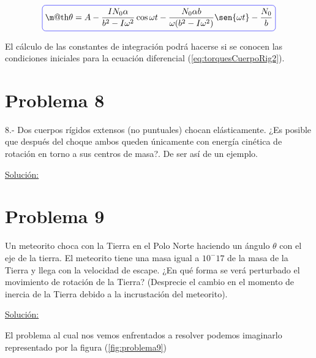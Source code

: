 \documentclass[a4paper,10pt]{article}
\makeatletter
\numberwithin{equation}{section}
\newcommand*{\boxcolor}{blue}
\renewcommand{\boxed}[1]{\textcolor{\boxcolor}{%
\tikz[baseline={([yshift=-1ex]current bounding box.center)}] \node [rectangle, minimum width=1ex,rounded corners,draw] {\normalcolor\m@th$\displaystyle#1$};}}
\makeatother
\begin{document}
\begin{equation}
 \boxed{\theta = A - \frac{IN_0 \alpha}{b^2-I\omega^2} \cos{\omega t} 
 - \frac{N_0 \alpha b}{\omega(b^2-I\omega^2)} \sen{\omega t} - \frac{N_0}{b}}
\end{equation}

El cálculo de las constantes de integración podrá hacerse si se conocen las condiciones iniciales
para la ecuación diferencial (\ref{eq:torquesCuerpoRig2}). 

\vspace{.3cm}

\section{Problema 8}
8.- Dos cuerpos rígidos extensos (no puntuales) chocan elásticamente. ¿Es posible que 
después del choque ambos queden únicamente con energía cinética de rotación en torno 
a sus centros de masa?. De ser así de un ejemplo.
\vspace{.3cm}

\underline{Solución:}

\vspace{.3cm}

\section{Problema 9}

Un meteorito choca con la Tierra en el Polo Norte haciendo un ángulo $\theta$ con
el eje de la tierra. El meteorito tiene una masa igual a $10^-17$ de la masa de la 
Tierra y llega con la velocidad de escape. ¿En qué forma se verá perturbado el movimiento
de rotación de la Tierra? (Desprecie el cambio en el momento de inercia de la Tierra
debido a la incrustación del meteorito).
\vspace{.3cm}

\underline{Solución:}\vspace{.3cm}

El problema al cual nos vemos enfrentados a resolver podemos imaginarlo representado
por la figura (\ref{fig:problema9})
\end{document}
